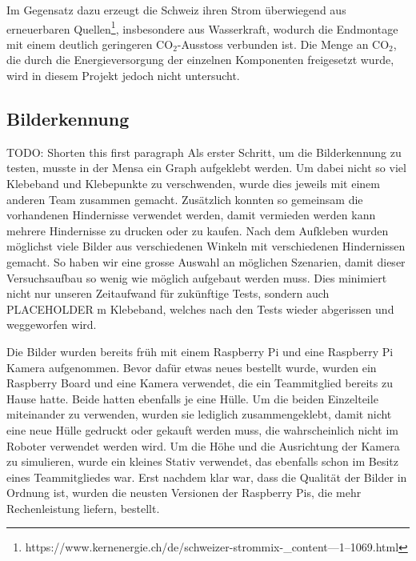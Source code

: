 Im Gegensatz dazu erzeugt die Schweiz ihren Strom überwiegend aus erneuerbaren Quellen\footnote{https://www.kernenergie.ch/de/schweizer-strommix-_content---1--1069.html}, insbesondere aus Wasserkraft, wodurch die Endmontage mit einem deutlich geringeren CO$_{2}$-Ausstoss verbunden ist. Die Menge an CO$_{2}$, die durch die Energieversorgung der einzelnen Komponenten freigesetzt wurde, wird in diesem Projekt jedoch nicht untersucht.




\subsection{Bilderkennung}

TODO: Shorten this first paragraph
Als erster Schritt, um die Bilderkennung zu testen, musste in der Mensa ein Graph aufgeklebt werden.
Um dabei nicht so viel Klebeband und Klebepunkte zu verschwenden, wurde dies jeweils mit einem anderen Team zusammen gemacht. Zusätzlich konnten so gemeinsam die vorhandenen Hindernisse verwendet werden, damit vermieden werden kann mehrere Hindernisse zu drucken oder zu kaufen.
Nach dem Aufkleben wurden möglichst viele Bilder aus verschiedenen Winkeln mit verschiedenen Hindernissen gemacht. So haben wir eine grosse Auswahl an möglichen Szenarien, damit dieser Versuchsaufbau so wenig wie möglich aufgebaut werden muss. Dies minimiert nicht nur unseren Zeitaufwand für zukünftige Tests, sondern auch PLACEHOLDER m Klebeband, welches nach den Tests wieder abgerissen und weggeworfen wird.

Die Bilder wurden bereits früh mit einem Raspberry Pi und eine Raspberry Pi Kamera aufgenommen. Bevor dafür etwas neues bestellt wurde, wurden ein Raspberry Board und eine Kamera verwendet, die ein Teammitglied bereits zu Hause hatte. Beide hatten ebenfalls je eine Hülle.
Um die beiden Einzelteile miteinander zu verwenden, wurden sie lediglich zusammengeklebt, damit nicht eine neue Hülle gedruckt oder gekauft werden muss, die wahrscheinlich nicht im Roboter verwendet werden wird.
Um die Höhe und die Ausrichtung der Kamera zu simulieren, wurde ein kleines Stativ verwendet, das ebenfalls schon im Besitz eines Teammitgliedes war.
Erst nachdem klar war, dass die Qualität der Bilder in Ordnung ist, wurden die neusten Versionen der Raspberry Pis, die mehr Rechenleistung liefern, bestellt.

